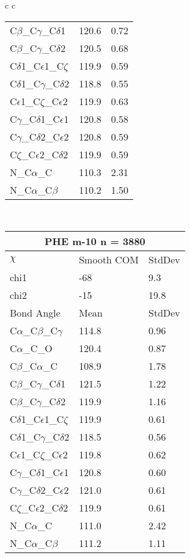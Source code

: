 \begin{longtable}{ c c }
\begin{tabular}{ l l l }
  C$\beta$\_C$\gamma$\_C$\delta$1 & 120.6 & 0.72\\
  C$\beta$\_C$\gamma$\_C$\delta$2 & 120.5 & 0.68\\
  C$\delta$1\_C$\epsilon$1\_C$\zeta$ & 119.9 & 0.59\\
  C$\delta$1\_C$\gamma$\_C$\delta$2 & 118.8 & 0.55\\
  C$\epsilon$1\_C$\zeta$\_C$\epsilon$2 & 119.9 & 0.63\\
  C$\gamma$\_C$\delta$1\_C$\epsilon$1 & 120.8 & 0.58\\
  C$\gamma$\_C$\delta$2\_C$\epsilon$2 & 120.8 & 0.59\\
  C$\zeta$\_C$\epsilon$2\_C$\delta$2 & 119.9 & 0.59\\
  N\_C$\alpha$\_C & 110.3 & 2.31\\
  N\_C$\alpha$\_C$\beta$ & 110.2 & 1.50\\
  \bottomrule
  \end{tabular}
  \\
  \begin{tabular}{ l l l }
  \toprule
  \multicolumn{3}{c}{PHE \textbf{m-10} n = 3880} \\ \toprule
  $\chi$       & Smooth COM & StdDev \\ \midrule
  chi1 & -68 & 9.3 \\ 
  chi2 & -15 & 19.8 \\ \midrule
  Bond Angle   & Mean     & StdDev \\ \midrule
  C$\alpha$\_C$\beta$\_C$\gamma$ & 114.8 & 0.96\\
  C$\alpha$\_C\_O & 120.4 & 0.87\\
  C$\beta$\_C$\alpha$\_C & 108.9 & 1.78\\
  C$\beta$\_C$\gamma$\_C$\delta$1 & 121.5 & 1.22\\
  C$\beta$\_C$\gamma$\_C$\delta$2 & 119.9 & 1.16\\
  C$\delta$1\_C$\epsilon$1\_C$\zeta$ & 119.9 & 0.61\\
  C$\delta$1\_C$\gamma$\_C$\delta$2 & 118.5 & 0.56\\
  C$\epsilon$1\_C$\zeta$\_C$\epsilon$2 & 119.8 & 0.62\\
  C$\gamma$\_C$\delta$1\_C$\epsilon$1 & 120.8 & 0.60\\
  C$\gamma$\_C$\delta$2\_C$\epsilon$2 & 121.0 & 0.61\\
  C$\zeta$\_C$\epsilon$2\_C$\delta$2 & 119.9 & 0.61\\
  N\_C$\alpha$\_C & 111.0 & 2.42\\
  N\_C$\alpha$\_C$\beta$ & 111.2 & 1.11\\

\end{tabular}
\end{longtable}
